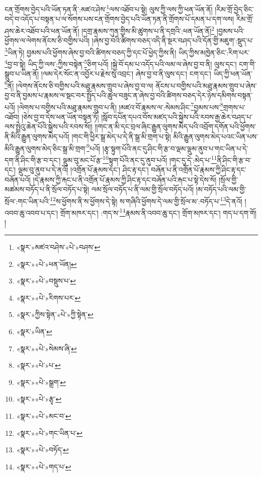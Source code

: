 ངན་གྲོགས་བྱེད་པའི་ཡོན་ཏན་ནི་:མཛའ་ཤེས་\footnote{«སྣར་»མཛའ་བཤེས་«པེ་»བཤས་}ལས་འཐོབ་པ་སྟེ། ལུས་ཀྱི་ལས་ཀྱི་ཕན་ཡོན་ནོ། །རིམ་གྲོ་བྱེད་ཅིང་བདེ་བ་འདོད་པ་བསྟན་པ་ལ་སོགས་པས་ངན་གྲོགས་བྱེད་པའི་ཡོན་ཏན་ནི་གྲོགས་པོ་དམན་པ་དག་ལས། རིམ་གྲོ་ཤས་ཆེར་འཐོབ་པའི་ཕན་ཡོན་ནོ། །དགྲ་རྣམས་ཀུན་གྱིས་མི་ཚུགས་པ་ནི་དགྲའི་:ཕན་ཡོན་ནོ།\footnote{«སྣར་»«པེ་»ཕན་ཡོན།} །བྱམས་པའི་ཕྱོགས་ལ་ལེགས་ནོངས་ཅི་བགྱིས་པའི། །ཞེས་བྱ་བའི་ཚིགས་བཅད་འདི་ནི་སྔར་བཤད་པའི་དོན་གྱི་མཇུག་:སྡུད་པ་\footnote{«སྣར་»«པེ་»བསྡུས་པ་}ཡིན་ཏེ། བྱམས་པའི་ཕྱོགས་ཞེས་བྱ་བའི་ཚིགས་བཅད་ཀྱི་དང་པོ་ཕྱེད་ཀྱིས་ནི། ཡིད་ཀྱིས་མཁྱེན་ཅིང་:རིག་པར་\footnote{«སྣར་»«པེ་»རིགས་པར་}བྱ་བ་སྟེ། ཡིད་ཀྱི་ལས་:ཀྱིས་བསྟེན་\footnote{«སྣར་»ཀྱིས་སྟེན་«པེ་»ཀྱི་སྟེན་}ཅིག་པའོ། །སྐྱེ་བོ་དམ་པ་འདོད་པའི་ལམ་ལ་ཞེས་བྱ་བ་ནི། ལུས་དང་། ངག་གི་སྒྲུབ་པ་ཡིན་ནོ། །ལམ་དེར་སོང་ན་འབྱོར་པ་རྗེས་སུ་འབྲང་། ཞེས་བྱ་བ་ནི་ལུས་དང་། ངག་དང་། ཡིད་ཀྱི་ཕན་ཡོན་\footnote{«སྣར་»ཡིན་}ནོ། །ལེགས་ནོངས་ཅི་བགྱིས་པའི་མཐུ་རྣམས་གྲུབ་པ་ཞེས་བྱ་བ་ལ། ནོངས་པ་བགྱིས་པའི་མཐུ་རྣམས་གྲུབ་པ་ཞེས་བྱ་བ་ནི་བྱམས་པ་རྣམས་ལ་སྡང་བར་སྤྱོད་པའི་ཚུལ་བཟུང་ན་ཞེས་བྱ་བའི་ཚིགས་བཅད་དེར་ཉེས་དམིགས་བསྟན་པའོ། །ལེགས་པ་བགྱིས་པའི་མཐུ་རྣམས་གྲུབ་པ་ནི། །མཛའ་བོ་རྣམས་ལ་:སེམས་ཤིང་\footnote{«སྣར་»«པེ་»སེམས་ཞི་}བྱམས་པས་\footnote{«སྣར་»«པེ་»པ་}གྲགས་པ་འཐོབ། །ཅེས་བྱ་བ་དེས་ཕན་ཡོན་བསྟན་ཏོ། །སློབ་དཔོན་དཔའ་བོས་མཛད་པའི་སྐྱེས་པའི་རབས་རྒྱ་ཆེར་བཤད་པ་ལས་སྤྲེའུ་ཆེན་པོའི་སྐྱེས་པའི་རབས་སོ།། །།གང་ན་མི་དང་བྲལ་ཞིང་རྒྱུན་ལུགས་མེད་པའི་འབྲོག་དགོན་པའི་ཕྱོགས་ནི་མིའི་རྒྱུན་ལུགས་མེད་པའོ། །གང་གི་ཕྱིར་སྒྲ་མེད་པ་དེ་ནི་སྒྲ་མི་གྲག་པ་སྟེ། མིའི་རྒྱུན་ལུགས་མེད་པའང་ཡིན་པས་མིའི་རྒྱུན་ལུགས་མེད་ཅིང་སྒྲ་མི་གྲག་\footnote{«སྣར་»«པེ་»སྒྲག་}པའོ། །རྩྭ་སྟུག་པོའི་ནང་དུ་ཤིང་གི་རྩ་བ་ལྡམ་ལྡུམ་ནུབ་པ་གང་ཡིན་པ་དེ་དག་ནི་ཤིང་གི་རྩ་བ་དང་། ལྡུམ་བུ་མང་པོ་རྩ་\footnote{«སྣར་»«པེ་»རྩྭ་}སྟུག་པོའི་ནང་དུ་ནུབ་པའོ། །གང་དུ་དེ་:མེད་པ་\footnote{«སྣར་»«པེ་»མང་བ་}ནི་ཤིང་གི་རྩ་བ་དང་། ལྡུམ་བུ་ནུབ་པ་དེ་ནའོ། །འགྲོན་པོ་རྣམས་དང་། ཤིང་རྟ་དང་། བཞོན་པ་ནི་འགྲོན་པོ་རྣམས་ཀྱི་ཤིང་རྟ་དང་བཞོན་པའོ། །དེ་རྣམས་ཀྱི་རྐང་པ་ནི་འགྲོན་པོ་རྣམས་ཀྱི་ཤིང་རྟ་དང་བཞོན་པའི་རྐང་པ་སྟེ་དེས་སོ། །སྲོལ་གྱི་མཚམས་བཏོད་པ་ནི་སྲོལ་བཏོད་པ་སྟེ། ལམ་སྲོལ་བཏོད་པ་ནི་ལམ་གྱི་སྲོལ་བཏོད་པའོ། །མ་བཏོད་པའི་ལམ་གྱི་སྲོལ་:གང་ཡིན་པའི་\footnote{«སྣར་»«པེ་»གང་ཡིན་པ་}ས་ཕྱོགས་ནི་ས་ཕྱོགས་དེ་སྟེ། ས་གཞིའི་ཕྱོགས་དེ་ལམ་གྱི་སྲོལ་མ་:བཏོད་པ་\footnote{«སྣར་»«པེ་»བཏོད་}དེ་ནའོ། །འབབ་ཆུ་འབབ་པ་དང་། གྲོག་མཁར་དང་། :གད་ས་\footnote{«སྣར་»«པེ་»གད་པ་}རྣམས་ནི་འབབ་ཆུ་དང་། གྲོག་མཁར་དང་། གད་པ་དག་གོ། །

